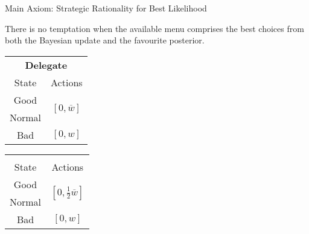 \documentclass[usenames,dvipsnames,aspectratio=169,11pt, envcountsect, handout]{beamer}
\begin{document}
\begin{frame}[noframenumbering]{Main Axiom: Strategic Rationality for Best Likelihood}

	\begin{axiom}
		There is no temptation when the available menu comprises the best choices from both the Bayesian update and the favourite posterior.
	\end{axiom}

	\vfill

	\begin{table}[H]
		\centering
		\begin{minipage}{0.4\textwidth}
			\centering
			\begin{tabular}{c | c}
				\multicolumn{2}{c}{\textbf{Delegate}}                                                     \\
				State                & Actions                                                            \\
				\hline
				{\color{blue}Good}   & \multirow{2}{*}{{\color{blue}\( \left[0, \overline{w} \right] \)}} \\
				{\color{blue}Normal} &                                                                    \\
				Bad                  & \( \left[0, w \right]\)                                            \\
			\end{tabular}
			\vspace{0.5cm} %
		\end{minipage}%
		\begin{minipage}{0.4\textwidth}
			\centering
			\begin{tabular}{c | c}
				\multicolumn{2}{c}{}                                                                                   \\
				State                & Actions                                                                         \\
				\hline
				{\color{blue}Good}   & \multirow{2}{*}{{\color{blue}\( \left[ 0, \frac{1}{2} \overline{w} \right] \)}} \\
				{\color{blue}Normal} &                                                                                 \\
				Bad                  & \( \left[0, w \right] \)                                                        \\
			\end{tabular}
			\vspace{0.5cm} %
		\end{minipage} %
	\end{table}


\end{frame}
\end{document}
